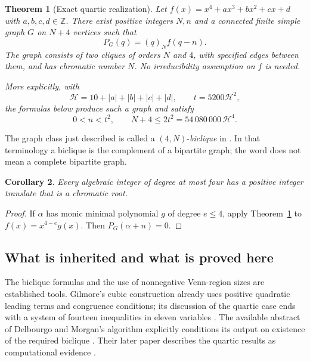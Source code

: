 \documentclass[11pt,a4paper]{article}
\newtheorem{theorem}{Theorem}[section]
\newtheorem{corollary}[theorem]{Corollary}
\theoremstyle{definition}
\newcommand{\Z}{\mathbb Z}
\newcommand{\fall}[2]{(#1)_{#2}}
\newcommand{\htf}{\mathcal H}
\begin{document}
\begin{theorem}[Exact quartic realization]\label{thm:main}
Let $f(x)=x^4+ax^3+bx^2+cx+d$ with $a,b,c,d\in\Z$. There exist
positive integers $N,n$ and a connected finite simple graph $G$ on $N+4$
vertices such that
\begin{equation}\label{eq:main}
 P_G(q)=\fall qN f(q-n).
\end{equation}
The graph consists of two cliques of orders $N$ and $4$, with specified
edges between them, and has chromatic number $N$. No irreducibility
assumption on $f$ is needed.

More explicitly, with
\begin{equation}\label{eq:height}
 \htf=10+|a|+|b|+|c|+|d|,\qquad t=5200\htf^2,
\end{equation}
the formulas below produce such a graph and satisfy
\begin{equation}\label{eq:size}
 0<n<t^2,\qquad N+4\le2t^2=54\,080\,000\,\htf^4.
\end{equation}
\end{theorem}

The graph class just described is called a $(4,N)$-\emph{biclique} in
\cite{Bohn,CM,Gilmore}. In that terminology a biclique is the complement
of a bipartite graph; the word does not mean a complete bipartite graph.

\begin{corollary}\label{cor:root}
Every algebraic integer of degree at most four has a positive integer
translate that is a chromatic root.
\end{corollary}
\begin{proof}
If $\alpha$ has monic minimal polynomial $g$ of degree $e\le4$, apply
Theorem~\ref{thm:main} to $f(x)=x^{4-e}g(x)$. Then
$P_G(\alpha+n)=0$.
\end{proof}

\subsection{What is inherited and what is proved here}

The biclique formulas and the use of nonnegative Venn-region sizes are
established tools. Gilmore's cubic construction already uses positive
quadratic leading terms and congruence conditions; its discussion of the
quartic case ends with a system of fourteen inequalities in eleven
variables \cite[Section 6.4, pp.~59--62]{Gilmore}. The available abstract
of Delbourgo and Morgan's algorithm explicitly conditions its output on
existence of the required biclique \cite{DM19}. Their later paper describes
the quartic results as computational evidence \cite[Section 1.1]{DM22}.
\end{document}
